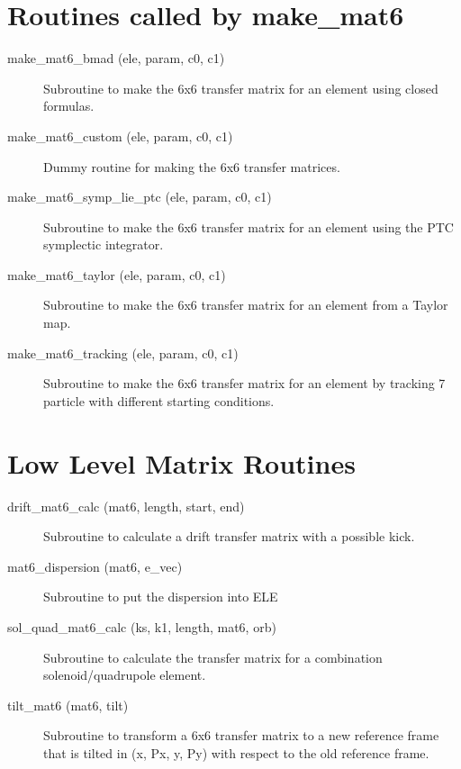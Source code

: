 \section{Routines called by make\_mat6}
\label{r:mat6}

\begin{description}

\item[make\_mat6\_bmad (ele, param, c0, c1)] \Newline
Subroutine to make the 6x6 transfer matrix for an element
using closed formulas.

\item[make\_mat6\_custom (ele, param, c0, c1)] \Newline
Dummy routine for making the 6x6 transfer matrices.

\item[make\_mat6\_symp\_lie\_ptc (ele, param, c0, c1)] \Newline
Subroutine to make the 6x6 transfer matrix for an element using
the PTC symplectic integrator.

\item[make\_mat6\_taylor (ele, param, c0, c1)] \Newline
Subroutine to make the 6x6 transfer matrix for an element
from a Taylor map.

\item[make\_mat6\_tracking (ele, param, c0, c1)] \Newline
Subroutine to make the 6x6 transfer matrix for an element by 
tracking 7 particle with different starting conditions.

\end{description}

\section{Low Level Matrix Routines}
\label{r:low_mat}  

\begin{description}

\item[drift\_mat6\_calc (mat6, length, start, end)] \Newline
Subroutine to calculate a drift transfer matrix with a possible kick. 

\item[mat6\_dispersion (mat6, e\_vec)] \Newline
Subroutine to put the dispersion into ELE%

\item[sol\_quad\_mat6\_calc (ks, k1, length, mat6, orb)] \Newline
Subroutine to calculate the transfer matrix for a combination solenoid/quadrupole element. 

\item[tilt\_mat6 (mat6, tilt)] \Newline
Subroutine to transform a 6x6 transfer matrix to a new reference frame that is 
tilted in (x, Px, y, Py) with respect to the old reference frame. 

\end{description}

